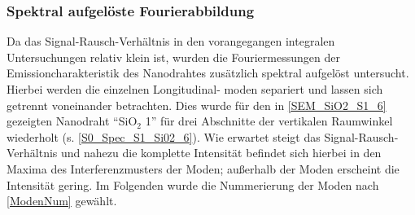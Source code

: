 \subsubsection{Spektral aufgelöste Fourierabbildung}
Da das Signal-Rausch-Verhältnis in den vorangegangen integralen Untersuchungen relativ klein ist, wurden die Fouriermessungen der Emissioncharakteristik des \mbox{Nano}drahtes zusätzlich spektral aufgelöst untersucht. Hierbei werden die einzelnen \mbox{Longitudinal-} moden separiert und lassen sich getrennt voneinander betrachten. Dies wurde für den in \autoref{SEM_SiO2_S1_6} gezeigten Nanodraht ``SiO$_\text{2}$ 1'' für drei Abschnitte der vertikalen Raumwinkel wiederholt (s. \autoref{S0_Spec_S1_Si02_6}). Wie erwartet steigt das Signal-Rausch-Verhältnis und nahezu die komplette Intensität befindet sich hierbei in den Maxima des Interferenzmusters der Moden; außerhalb der Moden erscheint die Intensität gering. Im Folgenden wurde die Nummerierung der Moden nach \autoref{ModenNum} gewählt.

